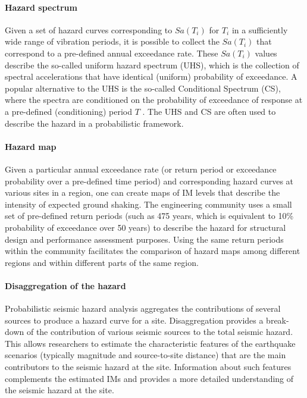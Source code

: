\paragraph{Hazard spectrum} Given a set of hazard curves corresponding to $Sa(T_i)$ for $T_i$ in a sufficiently wide range of vibration periods, it is possible to collect the $Sa(T_i)$ that correspond to a pre-defined annual exceedance rate. These $Sa(T_i)$ values describe the so-called uniform hazard spectrum (UHS), which is the collection of spectral accelerations that have identical (uniform) probability of exceedance. A popular alternative to the UHS is the so-called Conditional Spectrum (CS), where the spectra are conditioned on the probability of exceedance of response at a pre-defined (conditioning) period $T$ \citep{lin2013conditional, baker2018improved}. The UHS and CS are often used to describe the hazard in a probabilistic framework.

\paragraph{Hazard map} Given a particular annual exceedance rate (or return period or exceedance probability over a pre-defined time period) and corresponding hazard curves at various sites in a region, one can create maps of IM levels that describe the intensity of expected ground shaking. The engineering community uses a small set of pre-defined return periods (such as 475 years, which is equivalent to 10\% probability of exceedance over 50 years) to describe the hazard for structural design and performance assessment purposes. Using the same return periods within the community facilitates the comparison of hazard maps among different regions and within different parts of the same region.

\paragraph{Disaggregation of the hazard} Probabilistic seismic hazard analysis aggregates the contributions of several sources to produce a hazard curve for a site. Disaggregation provides a break-down of the contribution of various seismic sources to the total seismic hazard. This allows researchers to estimate the characteristic features of the earthquake scenarios (typically magnitude and source-to-site distance) that are the main contributors to the seismic hazard at the site. Information about such features complements the estimated IMs and provides a more detailed understanding of the seismic hazard at the site.

